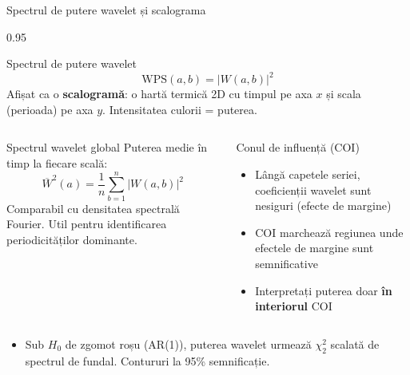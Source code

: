 \documentclass[9pt, aspectratio=169, t]{beamer}
\begin{document}
\begin{frame}{Spectrul de putere wavelet și scalograma}
    \begin{cminipage}{0.95\textwidth}
    \vspace{-2mm}
    \begin{block}{Spectrul de putere wavelet}
        {\small
        \[
            \text{WPS}(a, b) = |W(a, b)|^2
        \]
        Afișat ca o \textbf{scalogramă}: o hartă termică 2D cu timpul pe axa $x$ și scala (perioada) pe axa $y$. Intensitatea culorii = puterea.}
    \end{block}
    \vspace{-2mm}
    \begin{columns}[T]
        \begin{exampleblock}{Spectrul wavelet global}
            {\small Puterea medie în timp la fiecare scală:
            \[
                \overline{W}^2(a) = \frac{1}{n}\sum_{b=1}^{n} |W(a,b)|^2
            \]
            Comparabil cu densitatea spectrală Fourier. Util pentru identificarea periodicităților dominante.}
        \end{exampleblock}

        \begin{block}{Conul de influență (COI)}
            \begin{itemize}\setlength{\itemsep}{-2pt}
                \item Lângă capetele seriei, coeficienții wavelet sunt nesiguri (efecte de margine)
                \item COI marchează regiunea unde efectele de margine sunt semnificative
                \item Interpretați puterea doar \textbf{în interiorul} COI
            \end{itemize}
        \end{block}
    \end{columns}
    \vspace{-1mm}
    \begin{itemize}\setlength{\itemsep}{0pt}
        \item[\textbf{Semnif.}:] {\small Sub $H_0$ de zgomot roșu (AR(1)), puterea wavelet urmează $\chi^2_2$ scalată de spectrul de fundal. Contururi la 95\% semnificație.}
    \end{itemize}
    \end{cminipage}
\end{frame}
\end{document}

